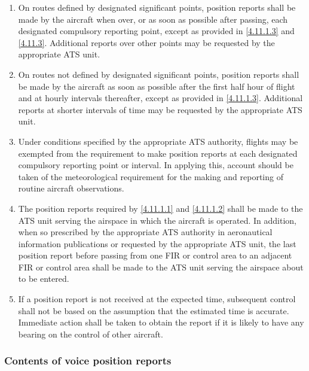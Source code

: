 \documentclass[../vATM.tex]{subfiles}
\begin{document}
    \begin{enumerate}
        \item \label{4.11.1.1} On routes defined by designated significant points, position reports shall be made by the aircraft when over, or as soon as possible after passing, each designated compulsory reporting point, except as provided in \ref{4.11.1.3} and \ref{4.11.3}. Additional reports over other points may be requested by the appropriate ATS unit.
        \item \label{4.11.1.2} On routes not defined by designated significant points, position reports shall be made by the aircraft as soon as possible after the first half hour of flight and at hourly intervals thereafter, except as provided in \ref{4.11.1.3}. Additional reports at shorter intervals of time may be requested by the appropriate ATS unit.
        \item \label{4.11.1.3} Under conditions specified by the appropriate ATS authority, flights may be exempted from the requirement to make position reports at each designated compulsory reporting point or interval. In applying this, account should be taken of the meteorological requirement for the making and reporting of routine aircraft observations.
        \item The position reports required by \ref{4.11.1.1} and \ref{4.11.1.2} shall be made to the ATS unit serving the airspace in which the aircraft is operated. In addition, when so prescribed by the appropriate ATS authority in aeronautical information publications or requested by the appropriate ATS unit, the last position report before passing from one FIR or control area to an adjacent FIR or control area shall be made to the ATS unit serving the airspace about to be entered.
        \item If a position report is not received at the expected time, subsequent control shall not be based on the assumption that the estimated time is accurate. Immediate action shall be taken to obtain the report if it is likely to have any bearing on the control of other aircraft.
    \end{enumerate}

    \subsubsection{Contents of voice position reports}
\end{document}
